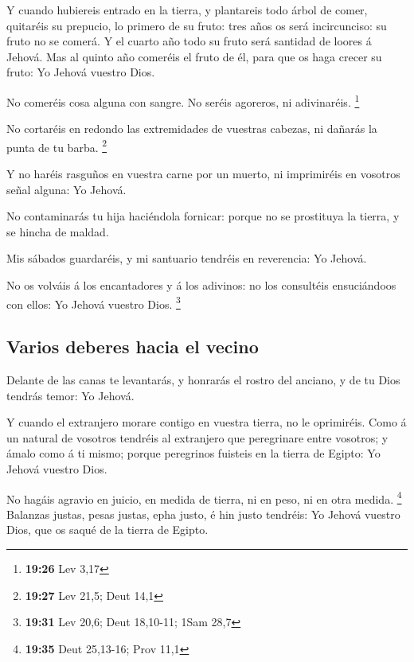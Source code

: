  Y cuando hubiereis entrado en la tierra, y plantareis
todo árbol de comer, quitaréis su prepucio, lo primero de su fruto: tres
años os será incircunciso: su fruto no se comerá.  Y el
cuarto año todo su fruto será santidad de loores á Jehová.
 Mas al quinto año comeréis el fruto de él, para que os
haga crecer su fruto: Yo Jehová vuestro Dios.

 No comeréis cosa alguna con sangre. No seréis agoreros,
ni adivinaréis. \footnote{\textbf{19:26} Lev 3,17}

 No cortaréis en redondo las extremidades de vuestras
cabezas, ni dañarás la punta de tu barba. \footnote{\textbf{19:27} Lev
  21,5; Deut 14,1}

 Y no haréis rasguños en vuestra carne por un muerto, ni
imprimiréis en vosotros señal alguna: Yo Jehová.

 No contaminarás tu hija haciéndola fornicar: porque no
se prostituya la tierra, y se hincha de maldad.

 Mis sábados guardaréis, y mi santuario tendréis en
reverencia: Yo Jehová.

 No os volváis á los encantadores y á los adivinos: no
los consultéis ensuciándoos con ellos: Yo Jehová vuestro Dios.
\footnote{\textbf{19:31} Lev 20,6; Deut 18,10-11; 1Sam 28,7}

\hypertarget{varios-deberes-hacia-el-vecino}{%
\subsection{Varios deberes hacia el
vecino}\label{varios-deberes-hacia-el-vecino}}

 Delante de las canas te levantarás, y honrarás el rostro
del anciano, y de tu Dios tendrás temor: Yo Jehová.

 Y cuando el extranjero morare contigo en vuestra tierra,
no le oprimiréis.  Como á un natural de vosotros tendréis
al extranjero que peregrinare entre vosotros; y ámalo como á ti mismo;
porque peregrinos fuisteis en la tierra de Egipto: Yo Jehová vuestro
Dios.

 No hagáis agravio en juicio, en medida de tierra, ni en
peso, ni en otra medida. \footnote{\textbf{19:35} Deut 25,13-16; Prov
  11,1}  Balanzas justas, pesas justas, epha justo, é hin
justo tendréis: Yo Jehová vuestro Dios, que os saqué de la tierra de
Egipto.

